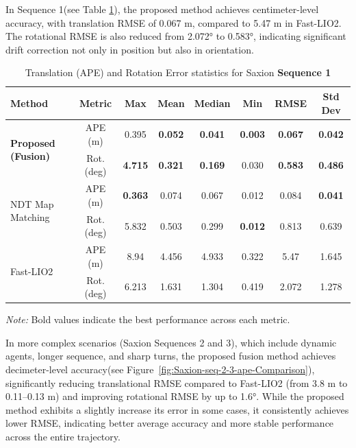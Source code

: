 In Sequence 1(see Table \ref{tab:ape_rot_saxion_seq1}), the proposed method achieves centimeter-level accuracy, with  translation RMSE of 0.067 m, compared to  5.47 m in Fast-LIO2. The rotational RMSE is also reduced from 2.072° to 0.583°, indicating significant drift correction not only in position but also in orientation.

\begin{table}[H]
	\centering
	\renewcommand{\arraystretch}{0.6}
	\setlength{\tabcolsep}{15pt}
	\caption{Translation (APE) and Rotation Error statistics for Saxion \textbf{Sequence 1} }
	\captionsetup{justification=justified, singlelinecheck=false}
	\label{tab:ape_rot_saxion_seq1}
	\begin{adjustbox}{width=\textwidth}
		\begin{tabular}{@{}lccccccc@{}}
			\toprule
			\textbf{Method} & \textbf{Metric} & \textbf{Max} & \textbf{Mean} & \textbf{Median} & \textbf{Min} & \textbf{RMSE} & \textbf{Std Dev} \\
			\midrule
			
			\multirow{2}{*}{\textbf{Proposed (Fusion)}} 
			& APE (m)        & 0.395   & \textbf{0.052 }   & \textbf{0.041}     & \textbf{0.003 }   &\textbf{ 0.067}   & \textbf{0.042 }\\
			& Rot. (deg)     & \textbf{4.715}   & \textbf{0.321}   & \textbf{0.169}   &{ 0.030 }   & \textbf{0.583}   &\textbf{ 0.486} \\
			\midrule
			
			\multirow{2}{*}{NDT  Map Matching} 
			& APE (m)        & \textbf{0.363 }  & 0.074    & 0.067     & 0.012    & 0.084   & \textbf{0.041} \\
			& Rot. (deg)     & 5.832   & 0.503    & 0.299     &\textbf{ 0.012}    & 0.813   & 0.639 \\
			\midrule
			
			\multirow{2}{*}{Fast-LIO2} 
			& APE (m)        & 8.94   & 4.456    & 4.933     & 0.322    & 5.47   & 1.645 \\
			& Rot. (deg)     & 6.213   & 1.631    & 1.304     & 0.419    & 2.072   & 1.278 \\
			\bottomrule
		\end{tabular}
	\end{adjustbox}
	\vspace{0.5em}
	{\footnotesize \textit{Note:} Bold values indicate the best performance across each metric.}
\end{table}
 In more complex scenarios (Saxion Sequences 2 and 3), which include dynamic agents, longer sequence, and sharp turns, the proposed fusion method achieves decimeter-level accuracy(see Figure~\ref{fig:Saxion-seq-2-3-ape-Comparison}), significantly reducing translational RMSE compared to Fast-LIO2 (from 3.8 m to 0.11–0.13 m) and improving rotational RMSE by up to 1.6°. While the proposed method exhibits a slightly increase its error in some cases, it consistently achieves lower RMSE, indicating better average accuracy and more stable performance across the entire trajectory.
 
